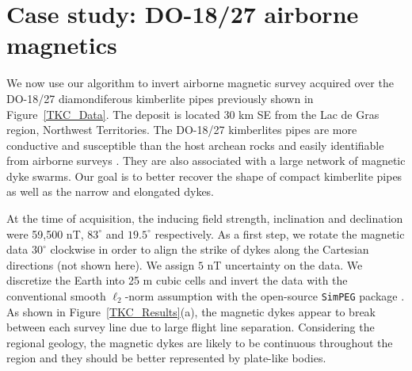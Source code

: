 \documentclass[extra,referee]{gji}
\begin{document}
\section{Case study: DO-18/27 airborne magnetics}

We now use our algorithm to invert airborne magnetic survey acquired over the DO-18/27 diamondiferous kimberlite pipes previously shown in Figure~\ref{TKC_Data}.
The deposit is located 30 km SE from the Lac de Gras region, Northwest Territories. The DO-18/27 kimberlites pipes are more conductive and susceptible than the host archean rocks and easily identifiable from airborne surveys \cite[]{Pell1997, Devriese2017a, Fournier2017}. They are also associated with a large network of magnetic dyke swarms. Our goal is to better recover the shape of compact kimberlite pipes as well as the narrow and elongated dykes.

At the time of acquisition, the inducing field strength, inclination and declination were 59,500 nT, $83^\circ$ and $19.5^\circ$ respectively.
As a first step, we rotate the magnetic data $30^\circ$ clockwise in order to align the strike of dykes along the Cartesian directions (not shown here). We assign $5$ nT uncertainty on the data. We discretize the Earth into 25 m cubic cells and invert the data with the conventional smooth $\ell_2$-norm assumption with the open-source \texttt{SimPEG} package \cite[]{Cockett2015}. As shown in  Figure~\ref{TKC_Results}(a), the magnetic dykes appear to break between each survey line due to large flight line separation. Considering the regional geology, the magnetic dykes are likely to be continuous throughout the region and they should be better represented by plate-like bodies.
\end{document}
